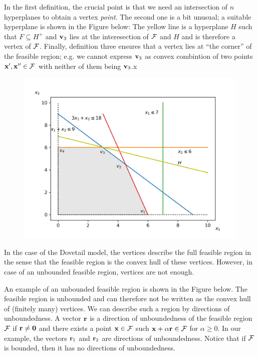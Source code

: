 In the first definition, the crucial point is that we need an intersection of $n$ hyperplanes to obtain a vertex \emph{point}. The second one is a bit unusual; a suitable hyperplane is shown in the Figure below: The yellow line is a hyperplane $H$ such that $F \subseteq H^+$ and $\mathbf{v}_3$ lies at the interesection of $\mathcal{F}$ and $H$ and is therefore a vertex of $\mathcal{F}$. Finally, definition three ensures that a vertex lies at ``the corner'' of the feasible region; e.g. we cannot express $\mathbf{v}_3$ as convex combintion of two points $\mathbf{x}', \mathbf{x}'' \in \mathcal{F}$ with neither of them being $\mathbf{v}_3$.x


\begin{figure}[H]
\includegraphics[scale = 0.7]{images/2022-09-27_lin_prog_1_02.png}
\end{figure}

In the case of the Dovetail model, the vertices describe the full feasible region in the sense that the feasible region is the convex hull of these vertices. However, in case of an unbounded feasible region, vertices are not enough.

An example of an unbounded feasible region is shown in the Figure below. The feasible region is unbounded and can therefore not be written as the convex hull of (finitely many) vertices. We can describe such a region by directions of unboundedness. A vector $\mathbf{r}$ is a direction of unboundedness of the feasible region $\mathcal{F}$ if $\mathbf{r} \neq \mathbf{0}$ and there exists a point $\mathbf{x} \in \mathcal{F}$ such $\mathbf{x} + \alpha \mathbf{r} \in \mathcal{F}$ for $\alpha \geq 0$. In our example, the vectors $\mathbf{r}_1$ and $\mathbf{r}_2$ are directions of unboundedness. Notice that if $\mathcal{F}$ is bounded, then it has no directions of unboundedness.

